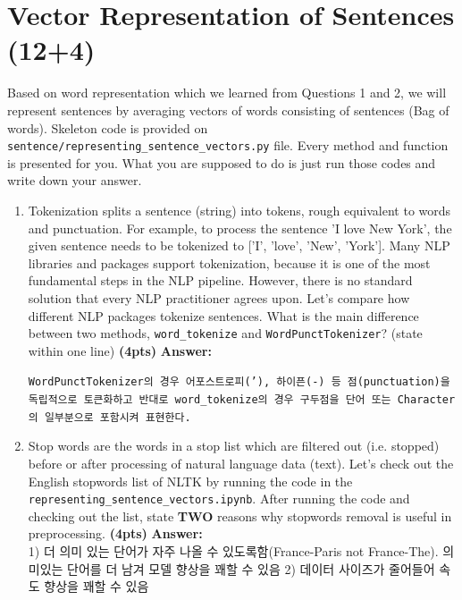 \documentclass{assignment format}
\newenvironment{answer}{
    {\bf Answer:} \begingroup\color{red}
}{\endgroup}%
\begin{document}
\section{Vector Representation of Sentences (12+4)}
Based on word representation which we learned from Questions 1 and 2, we will represent sentences by averaging vectors of words consisting of sentences (Bag of words). Skeleton code is provided on \texttt{sentence/}\texttt{representing}\newline\texttt{\_sentence}\texttt{\_vectors.py} file. Every method and function is presented for you. What you are supposed to do is just run those codes and write down your answer.
\begin{enumerate}[label=(\alph*)]
\item Tokenization splits a sentence (string) into tokens, rough equivalent to words and punctuation. For example, to process the sentence 'I love New York', the given sentence needs to be tokenized to ['I', 'love', 'New', 'York']. Many NLP libraries and packages support tokenization, because it is one of the most fundamental steps in the NLP pipeline. However, there is no standard solution that every NLP practitioner agrees upon. Let's compare how different NLP packages tokenize sentences.
\newline
What is the main difference between two methods, \texttt{word\_tokenize} and \texttt{WordPunctTokenizer}? (state within one line) \textbf{(4pts)}
\begin{answer} 
    \texttt{WordPunctTokenizer의 경우 어포스트로피('), 하이픈(-) 등 점(punctuation)을 독립적으로 토큰화하고 반대로 \texttt{word\_tokenize}의 경우 구두점을 단어 또는 Character의 일부분으로 포함시켜 표현한다.}
\end{answer}
\item Stop words are the words in a stop list which are filtered out (i.e. stopped) before or after processing of natural language data (text). Let's check out the English stopwords list of NLTK by running the code in the \texttt{representing\_sentence\_vectors.ipynb}.
\newline
After running the code and checking out the list, state \textbf{TWO} reasons why stopwords removal is useful in preprocessing. \textbf{(4pts)}
\begin{answer}\\
1) 더 의미 있는 단어가 자주 나올 수 있도록함(France-Paris not France-The). 의미있는 단어를 더 남겨 모델 향상을 꽤할 수 있음
2) 데이터 사이즈가 줄어들어 속도 향상을 꽤할 수 있음

\end{answer}
\end{enumerate}
\end{document}
